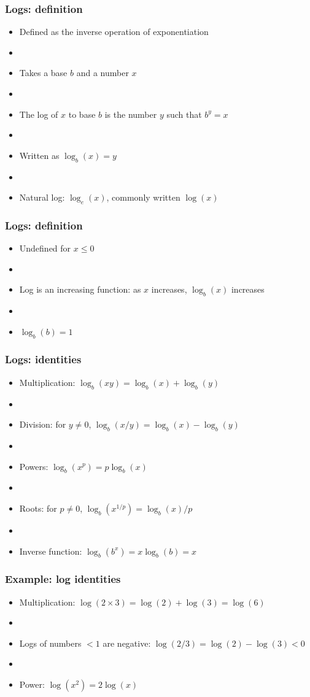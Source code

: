 \documentclass[12pt]{beamer}
\newcommand{\myframe}[1]{\begin{frame} \frametitle{#1}}
\begin{document}
\myframe{Logs: definition}
\begin{itemize}
\item Defined as the inverse operation of exponentiation
\item[]
\item Takes a base $b$ and a number $x$
\item[]
\item The log of $x$ to base $b$ is the number $y$ such that $b^y = x$
\item[]
\item Written as $\log_b(x) = y$
\item[]
\item Natural log: $\log_e(x)$, commonly written $\log(x)$
\end{itemize}
\end{frame}

\myframe{Logs: definition}
\begin{itemize}
\item Undefined for $x \leq 0$
\item[]
\item Log is an increasing function: as $x$ increases, $\log_b(x)$  increases
\item[]
\item $\log_b(b) = 1$
\end{itemize}
\end{frame}

\myframe{Logs: identities}
\begin{itemize}
\item Multiplication: $\log_b(xy) = \log_b(x) + \log_b(y)$
\item[]
\item Division: for $y \neq 0$, $\log_b(x/y) = \log_b(x) - \log_b(y)$
\item[]
\item Powers: $\log_b(x^p) = p \log_b(x)$
\item[]
\item Roots: for $p \neq 0$, $\log_b(x^{1/p}) = \log_b(x)/p$
\item[]
\item Inverse function: $\log_b(b^x) = x\log_b(b) = x$
\end{itemize}
\end{frame}

\myframe{Example: log identities}
\begin{itemize}
\item Multiplication: $\log (2 \times 3) = \log (2) + \log (3) = \log (6)$
\item[]
\item Logs of numbers $< 1$ are negative: $\log (2/3) = \log (2) - \log (3) < 0$
\item[]
\item Power: $\log (x^2) = 2\log (x)$
\end{itemize}
\end{frame}
\end{document}
